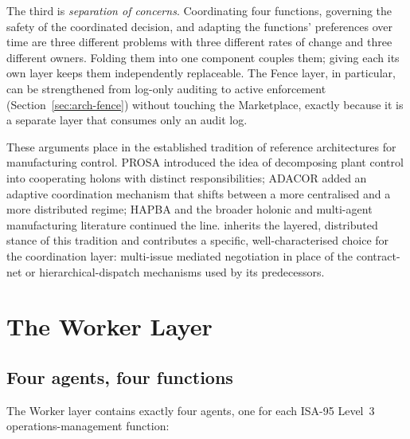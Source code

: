 The third is \emph{separation of concerns}. Coordinating four functions,
governing the safety of the coordinated decision, and adapting the
functions' preferences over time are three different problems with three
different rates of change and three different owners. Folding them into
one component couples them; giving each its own layer keeps them
independently replaceable. The Fence layer, in particular, can be
strengthened from log-only auditing to active enforcement
(Section~\ref{sec:arch-fence}) without touching the Marketplace, exactly
because it is a separate layer that consumes only an audit log.

These arguments place \NEXUS{} in the established tradition of
reference architectures for manufacturing control. PROSA
\cite{vanbrussel1998prosa} introduced the idea of decomposing plant
control into cooperating holons with distinct responsibilities; ADACOR
\cite{leitao2007holonic} added an adaptive coordination mechanism that
shifts between a more centralised and a more distributed regime; HAPBA
\cite{leitao2015hapba} and the broader holonic and multi-agent
manufacturing literature \cite{leitao2009survey,trentesaux2009,monostori2006}
continued the line. \NEXUS{} inherits the layered, distributed stance of
this tradition and contributes a specific, well-characterised choice for
the coordination layer: multi-issue mediated negotiation in place of the
contract-net or hierarchical-dispatch mechanisms used by its
predecessors.

\section{The Worker Layer}
\label{sec:arch-worker}

\subsection{Four agents, four functions}
\label{subsec:four-agents}

The Worker layer contains exactly four agents, one for each ISA-95
Level~3 operations-management function:

